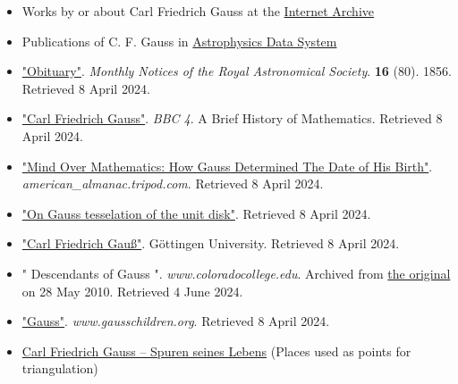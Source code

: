 \begin{itemize}
\tightlist
\item
  Works by or about Carl Friedrich Gauss at the \href{https://en.wikipedia.org/wiki/Internet_Archive}{Internet Archive}
\item
  Publications of C. F. Gauss in \href{https://en.wikipedia.org/wiki/Astrophysics_Data_System}{Astrophysics Data System}
\item
  \href{http://adsabs.harvard.edu//full/seri/MNRAS/0016//0000080.000.html}{"Obituary"}. \emph{Monthly Notices of the Royal Astronomical Society}. \textbf{16} (80). 1856{. Retrieved {8 April} 2024}.{}
\item
  \href{https://www.bbc.co.uk/programmes/b00ss0lf}{"Carl Friedrich Gauss"}. \emph{BBC 4}. A Brief History of Mathematics{. Retrieved {8 April} 2024}.{}
\item
  \href{http://american_almanac.tripod.com/gauss.htm}{"Mind Over Mathematics: How Gauss Determined The Date of His Birth"}. \emph{american\_almanac.tripod.com}{. Retrieved {8 April} 2024}.{}
\item
  \href{https://mathoverflow.net/questions/370190/how-did-gauss-characterize-the-metrical-relations-in-the-uniform-4-4-4-tiling}{"On Gauss\textquotesingle{} tesselation of the unit disk"}{. Retrieved {8 April} 2024}.{}
\item
  \href{https://www.uni-goettingen.de/en/62596.html}{"Carl Friedrich Gauß"}. Göttingen University{. Retrieved {8 April} 2024}.{}
\item
  " Descendants of Gauss ". \emph{www.coloradocollege.edu}. Archived from \href{http://www.coloradocollege.edu/library/SpecialCollections/CenturyChest/transcription24.html}{the original} on 28 May 2010{. Retrieved {4 June} 2024}.{}
\item
  \href{http://www.gausschildren.org/cfgauss/cfgauss.htm}{"Gauss"}. \emph{www.gausschildren.org}{. Retrieved {8 April} 2024}.{}
\item
  \href{https://denkmalatlas.niedersachsen.de/viewer/themen/Gauss-Steine/}{Carl Friedrich Gauss -- Spuren seines Lebens} (Places used as points for triangulation)
\end{itemize}









{}
